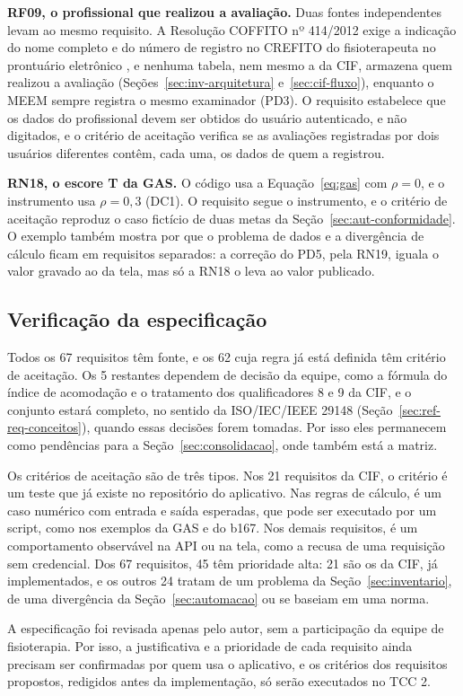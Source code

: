 \textbf{RF09, o profissional que realizou a avaliação.} Duas fontes independentes levam ao mesmo requisito. A
Resolução COFFITO nº 414/2012 exige a indicação do nome completo e do número de registro no CREFITO do fisioterapeuta
no prontuário eletrônico \cite[art.~2º, parágrafo único]{coffito414:2012}, e nenhuma tabela, nem mesmo a da CIF,
armazena quem realizou a avaliação (Seções~\ref{sec:inv-arquitetura} e~\ref{sec:cif-fluxo}), enquanto o MEEM sempre
registra o mesmo examinador (PD3). O requisito estabelece que os dados do profissional devem ser obtidos do usuário
autenticado, e não digitados, e o critério de aceitação verifica se as avaliações registradas por dois usuários
diferentes contêm, cada uma, os dados de quem a registrou.

\textbf{RN18, o escore T da GAS.} O código usa a Equação~\ref{eq:gas} com $\rho = 0$, e o instrumento usa
$\rho = 0{,}3$ (DC1). O requisito segue o instrumento, e o critério de aceitação reproduz o caso fictício de duas
metas da Seção~\ref{sec:aut-conformidade}. O exemplo também mostra por que o problema de dados e a divergência de
cálculo ficam em requisitos separados: a correção do PD5, pela RN19, iguala o valor gravado ao da tela, mas só a
RN18 o leva ao valor publicado.

\subsection{Verificação da especificação}
\label{sec:esp-verificacao}

Todos os 67 requisitos têm fonte, e os 62 cuja regra já está definida têm critério de aceitação. Os 5 restantes
dependem de decisão da equipe, como a fórmula do índice de acomodação e o tratamento dos qualificadores 8 e 9 da
CIF, e o conjunto estará completo, no sentido da ISO/IEC/IEEE 29148 (Seção~\ref{sec:ref-req-conceitos}), quando
essas decisões forem tomadas. Por isso eles permanecem como pendências para a Seção~\ref{sec:consolidacao}, onde
também está a matriz.

Os critérios de aceitação são de três tipos. Nos 21 requisitos da CIF, o critério é um teste que já existe no
repositório do aplicativo. Nas regras de cálculo, é um caso numérico com entrada e saída esperadas, que pode ser
executado por um script, como nos exemplos da GAS e do b167. Nos demais requisitos, é um comportamento observável
na API ou na tela, como a recusa de uma requisição sem credencial. Dos 67 requisitos, 45 têm prioridade alta: 21
são os da CIF, já implementados, e os outros 24 tratam de um problema da Seção~\ref{sec:inventario}, de uma
divergência da Seção~\ref{sec:automacao} ou se baseiam em uma norma.

A especificação foi revisada apenas pelo autor, sem a participação da equipe de fisioterapia. Por isso, a
justificativa e a prioridade de cada requisito ainda precisam ser confirmadas por quem usa o aplicativo, e os
critérios dos requisitos propostos, redigidos antes da implementação, só serão executados no TCC 2.

